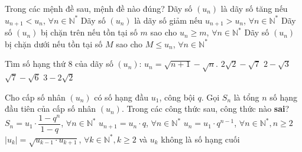 \begin{ex}%
	Trong các mệnh đề sau, mệnh đề nào đúng?
	\choice
	{Dãy số $(u_n)$ là dãy số tăng nếu $u_{n+1} < u_n$, $\forall n \in \mathbb{N}^*$}
	{Dãy số $(u_n)$ là dãy số giảm nếu $u_{n+1} > u_n$, $\forall n \in \mathbb{N}^*$}
	{Dãy số $(u_n)$ bị chặn trên  nếu tồn tại số $m$ sao cho $u_n \ge m$, $\forall n \in \mathbb{N}^*$}
	{\True Dãy số $(u_n)$ bị chặn dưới  nếu tồn tại số $M$ sao cho $M \le u_n$,  $\forall n \in \mathbb{N}^*$}
\end{ex}
\begin{ex}%
	Tìm số hạng thứ $8$ của dãy số $(u_n)$: $u_n = \sqrt{n+1} - \sqrt{n}$.
	\choice
	{$2 \sqrt{2} - \sqrt{7}$}
	{$2 - \sqrt{3}$}
	{$\sqrt{7} -  \sqrt{6}$}
	{\True $3 - 2 \sqrt{2}$}
\end{ex}
\begin{ex}%
	Cho cấp số nhân $(u_n)$ có số hạng đầu $u_1$, công bội $q$. Gọi $S_n$ là tổng $n$ số hạng đầu tiên của cấp số nhân $(u_n)$. Trong các công thức sau, công thức nào \textbf{sai}?
	\choice
	{\True $S_n = u_1  \cdot \dfrac{1-q^n}{1-q}$, $\forall n \in \mathbb{N}^*$}
	{$u_{n+1} = u_n \cdot q$, $\forall n \in \mathbb{N}^*$}
	{$u_{n} = u_1  \cdot q^{n-1}$, $\forall n \in \mathbb{N}^*, n \ge 2$}
	{$ \vert u_k \vert = \sqrt{u_{k-1} \cdot u_{k+1}}$, $\forall k \in \mathbb{N}^*, k \ge 2$ và $u_k$ không là số hạng cuối}
\end{ex}
